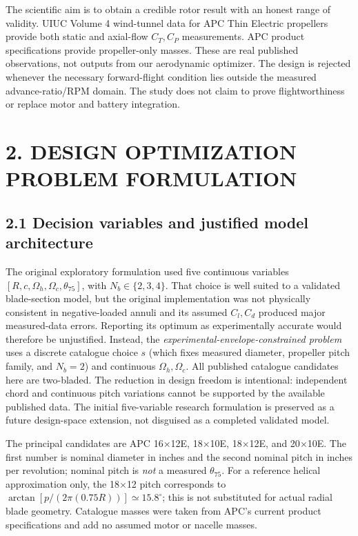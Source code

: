 \documentclass[12pt]{article}
\begin{document}
The scientific aim is to obtain a credible rotor result with an honest range of validity. UIUC Volume 4 wind-tunnel data for APC Thin Electric propellers provide both static and axial-flow $C_T,C_P$ measurements. APC product specifications provide propeller-only masses. These are real published observations, not outputs from our aerodynamic optimizer. The design is rejected whenever the necessary forward-flight condition lies outside the measured advance-ratio/RPM domain. The study does not claim to prove flightworthiness or replace motor and battery integration.

\section*{2. DESIGN OPTIMIZATION PROBLEM FORMULATION}
\subsection*{2.1 Decision variables and justified model architecture}
The original exploratory formulation used five continuous variables $[R,c,\Omega_h,\Omega_c,\theta_{75}]$, with $N_b\in\{2,3,4\}$. That choice is well suited to a validated blade-section model, but the original implementation was not physically consistent in negative-loaded annuli and its assumed $C_l,C_d$ produced major measured-data errors. Reporting its optimum as experimentally accurate would therefore be unjustified. Instead, the \emph{experimental-envelope-constrained problem} uses a discrete catalogue choice $s$ (which fixes measured diameter, propeller pitch family, and $N_b=2$) and continuous $\Omega_h,\Omega_c$. All published catalogue candidates here are two-bladed. The reduction in design freedom is intentional: independent chord and continuous pitch variations cannot be supported by the available published data. The initial five-variable research formulation is preserved as a future design-space extension, not disguised as a completed validated model.

The principal candidates are APC 16$\times$12E, 18$\times$10E, 18$\times$12E, and 20$\times$10E. The first number is nominal diameter in inches and the second nominal pitch in inches per revolution; nominal pitch is \emph{not} a measured $\theta_{75}$. For a reference helical approximation only, the 18$\times$12 pitch corresponds to $\arctan[p/(2\pi(0.75R))]\simeq15.8^\circ$; this is not substituted for actual radial blade geometry. Catalogue masses were taken from APC's current product specifications and add no assumed motor or nacelle masses.
\end{document}
